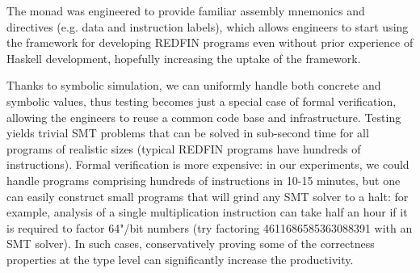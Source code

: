 
The  monad was engineered to provide familiar assembly mnemonics and
directives (e.g. data and instruction labels), which allows engineers to start
using the framework for developing REDFIN programs even without prior experience
of Haskell development, hopefully increasing the uptake of the framework.

Thanks to symbolic simulation, we can uniformly handle both concrete and
symbolic values, thus testing becomes just a special case of formal verification,
allowing the engineers to reuse a common code base and infrastructure.
Testing yields trivial SMT problems that can be solved in sub-second time for
all programs of realistic sizes (typical REDFIN programs have hundreds of
instructions). Formal verification is more expensive: in our experiments, we
could handle programs comprising hundreds of instructions in 10-15 minutes, but
one can easily construct small programs that will grind any SMT solver to a halt:
for example, analysis of a single multiplication instruction  can take
half an hour if it is required to factor 64"/bit numbers (try factoring
4611686585363088391 with an SMT solver). In such cases, conservatively proving
some of the correctness properties at the type level can significantly increase
the productivity.

